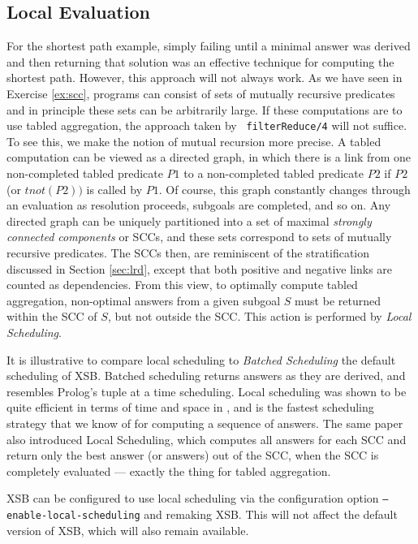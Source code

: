 \subsection{Local Evaluation} \label{sec:local}

For the shortest path example, simply failing until a minimal answer
was derived and then returning that solution was an effective
technique for computing the shortest path.  However, this approach
will not always work.  As we have seen in Exercise \ref{ex:scc},
programs can consist of sets of mutually recursive predicates and in
principle these sets can be arbitrarily large.  If these computations
are to use tabled aggregation, the approach taken by {\tt
filterReduce/4} will not suffice.  To see this, we make the notion of
mutual recursion more precise.  A tabled computation can be viewed as
a directed graph, in which there is a link from one non-completed
tabled predicate $P1$ to a non-completed tabled predicate $P2$ if $P2$
(or $tnot(P2))$ is called by $P1$.  Of course, this graph constantly
changes through an evaluation as resolution proceeds, subgoals are
completed, and so on.  Any directed graph can be uniquely partitioned
into a set of maximal {\em strongly connected components} or SCCs, and
these sets correspond to sets of mutually recursive predicates.  The
SCCs then, are reminiscent of the \LRD stratification discussed in
Section \ref{sec:lrd}, except that both positive and negative links
are counted as dependencies.  From this view, to optimally compute
tabled aggregation, non-optimal answers from a given subgoal $S$ must
be returned within the SCC of $S$, but not outside the SCC.  This
action is performed by {\em Local Scheduling}.

It is illustrative to compare local scheduling to {\em Batched
Scheduling} the default scheduling of XSB\@.  Batched scheduling returns
answers as they are derived, and resembles Prolog's tuple at a time
scheduling.  Local scheduling was shown to be quite efficient in terms
of time and space in \cite{JFLP-Scheduling}, and is the fastest
scheduling strategy that we know of for computing a sequence of
answers.  The same paper also introduced Local Scheduling, which
computes all answers for each SCC and return only the best answer (or
answers) out of the SCC, when the SCC is completely evaluated ---
exactly the thing for tabled aggregation.

XSB can be configured to use local scheduling via the configuration
option {\tt --enable-local-scheduling} and remaking XSB\@.  This will
not affect the default version of XSB, which will also remain
available.


